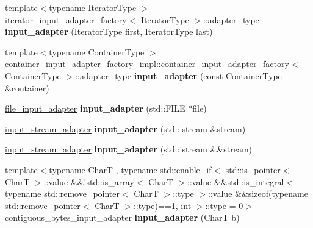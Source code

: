 \begin{DoxyCompactItemize}
{\footnotesize template$<$typename Iterator\+Type $>$ }\\\hyperlink{structnlohmann_1_1detail_1_1iterator__input__adapter__factory}{iterator\+\_\+input\+\_\+adapter\+\_\+factory}$<$ Iterator\+Type $>$\+::adapter\+\_\+type {\bfseries input\+\_\+adapter} (Iterator\+Type first, Iterator\+Type last)
\item 
\mbox{\label{namespacenlohmann_1_1detail_a611bebbfa9ee64dd8fee1e8c4bc3cbf6}} 
{\footnotesize template$<$typename Container\+Type $>$ }\\\hyperlink{structnlohmann_1_1detail_1_1container__input__adapter__factory__impl_1_1container__input__adapter__factory}{container\+\_\+input\+\_\+adapter\+\_\+factory\+\_\+impl\+::container\+\_\+input\+\_\+adapter\+\_\+factory}$<$ Container\+Type $>$\+::adapter\+\_\+type {\bfseries input\+\_\+adapter} (const Container\+Type \&container)
\item 
\mbox{\label{namespacenlohmann_1_1detail_a520988513cac994a1dfd16b5859a1ca6}} 
\hyperlink{classnlohmann_1_1detail_1_1file__input__adapter}{file\+\_\+input\+\_\+adapter} {\bfseries input\+\_\+adapter} (std\+::\+F\+I\+LE $\ast$file)
\item 
\mbox{\label{namespacenlohmann_1_1detail_af9fa97bf92767dc7f9dfe1abdfb1c6ce}} 
\hyperlink{classnlohmann_1_1detail_1_1input__stream__adapter}{input\+\_\+stream\+\_\+adapter} {\bfseries input\+\_\+adapter} (std\+::istream \&stream)
\item 
\mbox{\label{namespacenlohmann_1_1detail_aaf150c2591ecac4e821e9036ef847ef8}} 
\hyperlink{classnlohmann_1_1detail_1_1input__stream__adapter}{input\+\_\+stream\+\_\+adapter} {\bfseries input\+\_\+adapter} (std\+::istream \&\&stream)
\item 
\mbox{\label{namespacenlohmann_1_1detail_a690f7e555056ce490bd47dd5cdf9b48d}} 
{\footnotesize template$<$typename CharT , typename std\+::enable\+\_\+if$<$ std\+::is\+\_\+pointer$<$ Char\+T $>$\+::value \&\&!std\+::is\+\_\+array$<$ Char\+T $>$\+::value \&\&std\+::is\+\_\+integral$<$ typename std\+::remove\+\_\+pointer$<$ Char\+T $>$\+::type $>$\+::value \&\&sizeof(typename std\+::remove\+\_\+pointer$<$ Char\+T $>$\+::type)==1, int $>$\+::type  = 0$>$ }\\contiguous\+\_\+bytes\+\_\+input\+\_\+adapter {\bfseries input\+\_\+adapter} (CharT b)

\end{DoxyCompactItemize}
